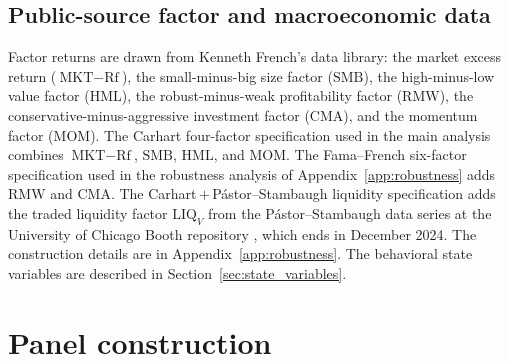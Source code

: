 \documentclass[12pt, oneside]{report}
\begin{document}
\subsection{Public-source factor and macroeconomic data}
\label{sec:public_data}

\noindent Factor returns are drawn from Kenneth French's data library:
the market excess return ($\text{MKT} - \text{Rf}$), the small-minus-big
size factor ($\text{SMB}$), the high-minus-low value factor
($\text{HML}$), the robust-minus-weak profitability factor
($\text{RMW}$), the conservative-minus-aggressive investment factor
($\text{CMA}$), and the momentum factor ($\text{MOM}$). The Carhart
four-factor specification used in the main analysis combines
$\text{MKT} - \text{Rf}$, $\text{SMB}$, $\text{HML}$, and
$\text{MOM}$. The Fama--French six-factor specification used in the
robustness analysis of Appendix~\ref{app:robustness} adds $\text{RMW}$
and $\text{CMA}$. The Carhart\,$+$\,Pástor--Stambaugh liquidity
specification adds the traded liquidity factor $\text{LIQ}_V$ from the
Pástor--Stambaugh data series at the University of Chicago Booth
repository \parencite{PastorStambaugh2003}, which ends in December 2024.
The construction details are in Appendix~\ref{app:robustness}. The
behavioral state variables are described in
Section~\ref{sec:state_variables}.

\section{Panel construction}
\label{sec:panel_construction}
\end{document}
